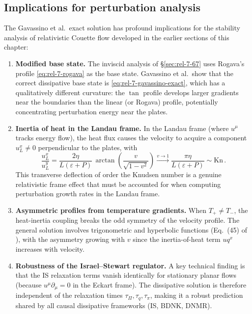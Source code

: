 \subsection{Implications for perturbation analysis}
\label{sec:rel-7-gavassino-implications}

The Gavassino et al.\ exact solution has profound implications for the
stability analysis of relativistic Couette flow developed in the earlier
sections of this chapter:

\begin{enumerate}
\item \textbf{Modified base state.}  The inviscid analysis of
  \S\ref{sec:rel-7-67} uses Rogava's profile \eqref{eq:rel-7-rogava} as
  the base state.  Gavassino et al.\ show that the correct dissipative
  base state is \eqref{eq:rel-7-gavassino-exact}, which has a qualitatively
  different curvature: the $\tan$ profile develops larger gradients near
  the boundaries than the linear (or Rogava) profile, potentially
  concentrating perturbation energy near the plates.

\item \textbf{Inertia of heat in the Landau frame.}  In the Landau frame
  (where $u^\mu$ tracks energy flow), the heat flux causes the velocity
  to acquire a component $u_L^x \neq 0$ perpendicular to the plates, with
  \begin{equation}
  \label{eq:rel-7-landau-deflection}
  \frac{u_L^x}{u_L^y} = \frac{2\eta}{L(\varepsilon+P)}\,
    \arctan\!\left(\frac{v}{\sqrt{1-v^2}}\right)
    \xrightarrow{v\to 1} \frac{\pi\eta}{L(\varepsilon+P)}
    \sim \text{Kn}\,.
  \end{equation}
  This transverse deflection of order the Knudsen number is a genuine
  relativistic frame effect that must be accounted for when computing
  perturbation growth rates in the Landau frame.

\item \textbf{Asymmetric profiles from temperature gradients.}
  When $T_+ \neq T_-$, the heat-inertia coupling breaks the odd
  symmetry of the velocity profile.  The general solution involves
  trigonometric and hyperbolic functions (Eq.~(45) of
  \citealt{GavassinoCouette2025}), with the asymmetry growing with
  $v$ since the inertia-of-heat term $u q^x$ increases with velocity.

\item \textbf{Robustness of the Israel--Stewart regulator.}
  A key technical finding is that the IS relaxation terms vanish
  identically for stationary planar flows (because $u^\mu\partial_\mu = 0$
  in the Eckart frame).  The dissipative solution is therefore independent
  of the relaxation times $\tau_\Pi, \tau_q, \tau_\pi$, making it
  a robust prediction shared by all causal dissipative frameworks
  (IS, BDNK, DNMR).
\end{enumerate}

